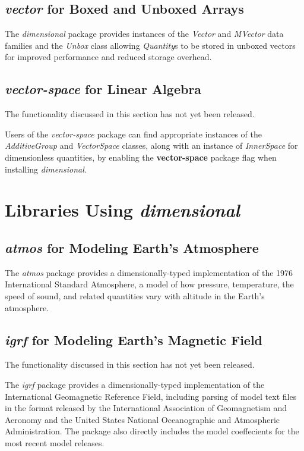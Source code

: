 \documentclass[11pt]{report}
\newcommand{\packagename}[1]{\textit{#1}}
\newcommand{\thispackage}{\packagename{dimensional}}
\newcommand{\classname}[1]{\textit{#1}}
\newcommand{\typename}[1]{\textit{#1}}
\newcommand{\flag}[1]{\textbf{#1}}
\newcommand{\prerelease}{\begin{tcolorbox}
The functionality discussed in this section has not yet been released.
\end{tcolorbox}}
\begin{document}
\section{\packagename{vector} for Boxed and Unboxed Arrays}

The \thispackage{} package provides instances of the \typename{Vector} and \typename{MVector} data families and the \classname{Unbox} class
allowing \typename{Quantity}s to be stored in unboxed vectors for improved performance and reduced storage overhead.

\section{\packagename{vector-space} for Linear Algebra}

\prerelease{}

Users of the \packagename{vector-space} package can find appropriate instances of
the \classname{AdditiveGroup} and \classname{VectorSpace} classes, along with an
instance of \classname{InnerSpace} for dimensionless quantities, by enabling the \flag{vector-space}
package flag when installing \thispackage{}.

\chapter{Libraries Using \thispackage}

\section{\packagename{atmos} for Modeling Earth's Atmosphere}

The \packagename{atmos} package provides a dimensionally-typed implementation of the 1976 International Standard
Atmosphere, a model of how pressure, temperature, the speed of sound, and related quantities vary with
altitude in the Earth's atmosphere.

\section{\packagename{igrf} for Modeling Earth's Magnetic Field}

\prerelease{}

The \packagename{igrf} package provides a dimensionally-typed implementation of the International Geomagnetic
Reference Field, including parsing of model text files in the format released by the International Association of
Geomagnetism and Aeronomy and the United States National Oceanographic and Atmospheric Administration. The
package also directly includes the model coeffecients for the most recent model releases.
\end{document}

